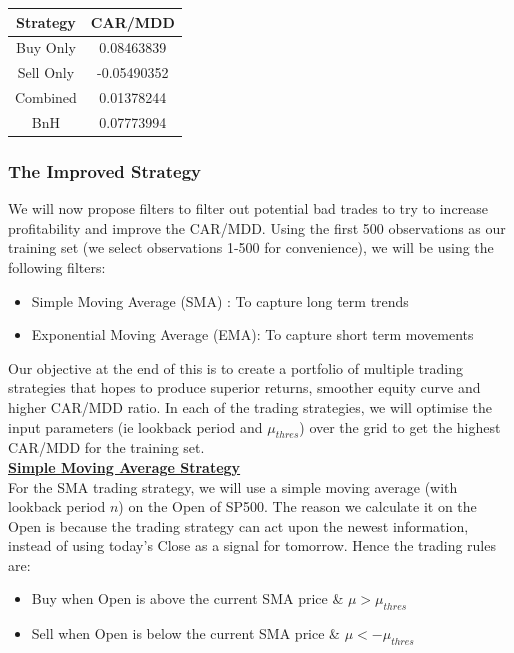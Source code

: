 \documentclass[12pt]{article}
\theoremstyle{definition}
\begin{document}
\begin{table}[H]
\centering
\begin{tabular}{|c|c|}
\hline
Strategy & CAR/MDD\\
\hline
Buy Only & 0.08463839\\     
Sell Only & -0.05490352\\
Combined & 0.01378244\\
BnH &  0.07773994\\
\hline
\end{tabular}
\end{table}

\subsubsection{The Improved Strategy}
We will now propose filters to filter out potential bad trades to try to increase profitability and improve the CAR/MDD. Using the first 500 observations as our training set (we select observations 1-500 for convenience), we will be using the following filters:
\begin{itemize}
\item Simple Moving Average (SMA) : To capture long term trends
\item Exponential Moving Average (EMA): To capture short term movements
\end{itemize}
Our objective at the end of this is to create a portfolio of multiple trading strategies that hopes to produce superior returns, smoother equity curve and higher CAR/MDD ratio. In each of the trading strategies, we will optimise the input parameters (ie lookback period and $\mu_{thres}$) over the grid to get the highest CAR/MDD for the training set.\\
\bigskip
\textbf{\underline{Simple Moving Average Strategy}}\\
For the SMA trading strategy, we will use a simple moving average (with lookback period $n$) on the Open of SP500. The reason we calculate it on the Open is because the trading strategy can act upon the newest information, instead of using today's Close as a signal for tomorrow. Hence the trading rules are:
\begin{itemize}
\item Buy when Open is above the current SMA price \& $\mu>\mu_{thres}$
\item Sell when Open is below the current SMA price \& $\mu<-\mu_{thres}$
\end{itemize}
\end{document}
